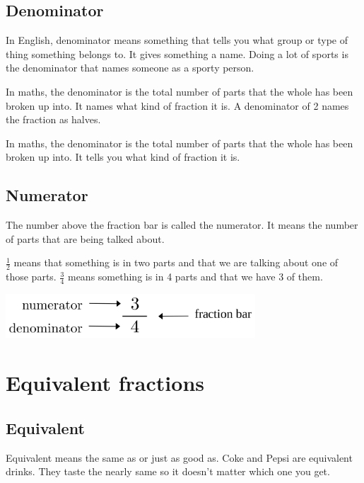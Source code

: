 \documentclass[16pt]{article}
\begin{document}
\begin{spacing}{1.25}
\subsection*{Denominator}
In English, denominator means something that tells you what group or type of thing something belongs to. It gives something a name. 
Doing a lot of sports is the denominator that names someone as a sporty person.

In maths, the denominator is the total number of parts that the whole has been broken up into. It names what kind of fraction it is. A denominator of 2 names the fraction as halves.

In maths, the denominator is the total number of parts that the whole has been broken up into. It tells you what kind of fraction it is.

\subsection*{Numerator}
The number above the fraction bar is called the numerator. It means the number of parts that are being talked about.

$\frac{1}{2}$ means that something is in two parts and that we are talking about one of those parts. $\frac{3}{4}$ means something is in 4 parts and that we have 3 of them.

\vspace{28pt}
\includegraphics[width=0.7\textwidth]{fraction diagram.png}
\vspace{14pt}
\begin{center}
\end{center}

\pagebreak

\section{Equivalent fractions}

\subsection*{Equivalent}
Equivalent means the same as or just as good as. Coke and Pepsi are equivalent drinks. They taste the nearly same so it doesn’t matter which one you get.


\end{spacing}
\end{document}
